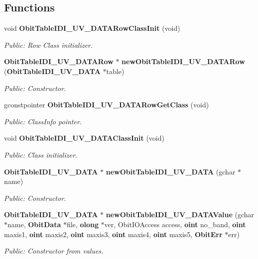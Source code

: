 \subsection*{Functions}
\begin{CompactItemize}
\item 
void {\bf Obit\-Table\-IDI\_\-UV\_\-DATARow\-Class\-Init} (void)
\begin{CompactList}\small\item\em Public: Row Class initializer. \item\end{CompactList}\item 
{\bf Obit\-Table\-IDI\_\-UV\_\-DATARow} $\ast$ {\bf new\-Obit\-Table\-IDI\_\-UV\_\-DATARow} ({\bf Obit\-Table\-IDI\_\-UV\_\-DATA} $\ast$table)
\begin{CompactList}\small\item\em Public: Constructor. \item\end{CompactList}\item 
gconstpointer {\bf Obit\-Table\-IDI\_\-UV\_\-DATARow\-Get\-Class} (void)
\begin{CompactList}\small\item\em Public: Class\-Info pointer. \item\end{CompactList}\item 
void {\bf Obit\-Table\-IDI\_\-UV\_\-DATAClass\-Init} (void)
\begin{CompactList}\small\item\em Public: Class initializer. \item\end{CompactList}\item 
{\bf Obit\-Table\-IDI\_\-UV\_\-DATA} $\ast$ {\bf new\-Obit\-Table\-IDI\_\-UV\_\-DATA} (gchar $\ast$name)
\begin{CompactList}\small\item\em Public: Constructor. \item\end{CompactList}\item 
{\bf Obit\-Table\-IDI\_\-UV\_\-DATA} $\ast$ {\bf new\-Obit\-Table\-IDI\_\-UV\_\-DATAValue} (gchar $\ast$name, {\bf Obit\-Data} $\ast$file, {\bf olong} $\ast$ver, Obit\-IOAccess access, {\bf oint} no\_\-band, {\bf oint} maxis1, {\bf oint} maxis2, {\bf oint} maxis3, {\bf oint} maxis4, {\bf oint} maxis5, {\bf Obit\-Err} $\ast$err)
\begin{CompactList}\small\item\em Public: Constructor from values. \item\end{CompactList}\item 

\end{CompactItemize}
